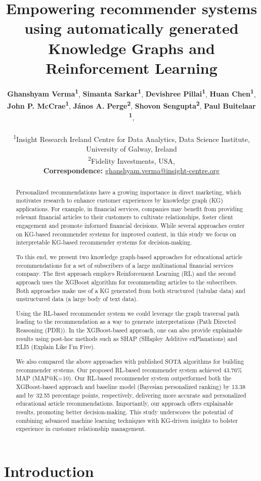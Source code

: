 \documentclass[11pt]{article}
\title{Empowering recommender systems using automatically generated Knowledge Graphs and Reinforcement Learning}
\author{
 \textbf{Ghanshyam Verma\textsuperscript{1}},
 \textbf{Simanta Sarkar\textsuperscript{1}},
 \textbf{Devishree Pillai\textsuperscript{1}},
 \textbf{Huan Chen\textsuperscript{1}},
\\
 \textbf{John P. McCrae\textsuperscript{1}},
 \textbf{János A. Perge\textsuperscript{2}},
 \textbf{Shovon Sengupta\textsuperscript{2}},
 \textbf{Paul Buitelaar \textsuperscript{1}},
\\
\\
 \textsuperscript{1}Insight Research Ireland Centre for Data Analytics, Data Science Institute, University of Galway, Ireland \\
 \textsuperscript{2}Fidelity Investments, USA,
\\
 \small{
   \textbf{Correspondence:} \href{mailto:ghanshyam.verma@insight-centre.org}{ghanshyam.verma@insight-centre.org}
 }
}
\begin{document}
\maketitle
\begin{abstract}
Personalized recommendations have a growing importance in direct marketing, which motivates research to enhance customer experiences by knowledge graph (KG) applications. For example, in financial services, companies may benefit from providing relevant financial articles to their customers to cultivate relationships, foster client engagement and promote informed financial decisions. While several approaches center on KG-based recommender systems for improved content, in this study we focus on interpretable KG-based recommender systems for decision-making.

To this end, we present two knowledge graph-based approaches for educational article recommendations for a set of subscribers of a large multinational financial services company. The first approach employs Reinforcement Learning (RL) and the second approach uses the XGBoost algorithm for recommending articles to the subscribers. Both approaches make use of a KG generated from both structured (tabular data) and unstructured data (a large body of text data).

Using the RL-based recommender system we could leverage the graph traversal path leading to the recommendation as a way to generate interpretations (Path Directed Reasoning (PDR)). In the XGBoost-based approach, one can also provide explainable results using post-hoc methods such as SHAP (SHapley Additive exPlanations) and ELI5 (Explain Like I’m Five).

We also compared the above approaches with published SOTA algorithms for building recommender systems. Our proposed RL-based recommender system achieved 43.76\% MAP (MAP@K=10). Our RL-based recommender system outperformed both the XGBoost-based approach and baseline model (Bayesian personalized ranking) by 13.38 and by 32.55 percentage points, respectively, delivering more accurate and personalized educational article recommendations. Importantly, our approach offers explainable results, promoting better decision-making. This study underscores the potential of combining advanced machine learning techniques with KG-driven insights to bolster experience in customer relationship management.
\end{abstract}

\section{Introduction}
\end{document}
